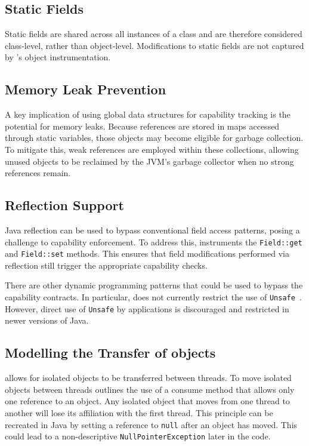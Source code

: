 \subsection{Static Fields}
Static fields are shared across all instances of a class and are therefore considered class-level, rather than object-level. Modifications to static fields are not captured by \jdala's object instrumentation. 

\subsection{Memory Leak Prevention}

A key implication of using global data structures for capability tracking is the potential for memory leaks. Because references are stored in maps accessed through static variables, those objects may become eligible for garbage collection. To mitigate this, weak references are employed within these collections, allowing unused objects to be reclaimed by the JVM's garbage collector when no strong references remain.


\subsection{Reflection Support}

Java reflection can be used to bypass conventional field access patterns, posing a challenge to capability enforcement. To address this, \jdala instruments the \texttt{Field::get} and \texttt{Field::set} methods. This ensures that field modifications performed via reflection still trigger the appropriate capability checks.

There are other dynamic programming patterns that could be used to bypass the capability contracts. In particular, \jdala does not currently restrict the use of \texttt{Unsafe}~\cite{mastrangelo2015use}. However, direct use of \texttt{Unsafe} by applications is discouraged and restricted in newer versions of Java.


\subsection{Modelling the Transfer of \Isolated objects}

\dala allows for isolated objects to be transferred between threads.
To move isolated objects between threads \dala outlines the use of a consume method that allows only one reference to an object. 
Any isolated object that moves from one thread to another will lose its affiliation with the first thread. This principle can be recreated in Java by setting a reference to \texttt{null} after an object has moved. This could lead to a non-descriptive \texttt{NullPointerException} later in the code.

